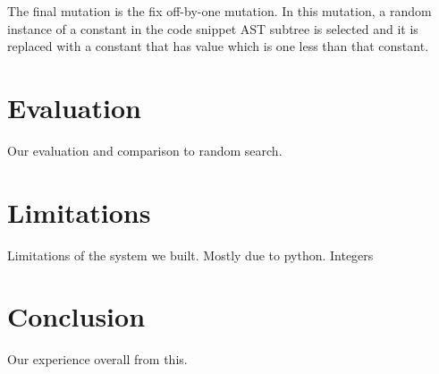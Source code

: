 \documentclass{article}
\begin{document}
The final mutation is the fix off-by-one mutation. In this mutation, a random instance of a constant in the code snippet AST subtree is selected and it is replaced with a constant that has value which is one less than that constant. 


\section{Evaluation}
Our evaluation and comparison to random search.


\section{Limitations}
Limitations of the system we built. Mostly due to python.
Integers 


\section{Conclusion}
Our experience overall from this.

\printbibliography
\end{document}
